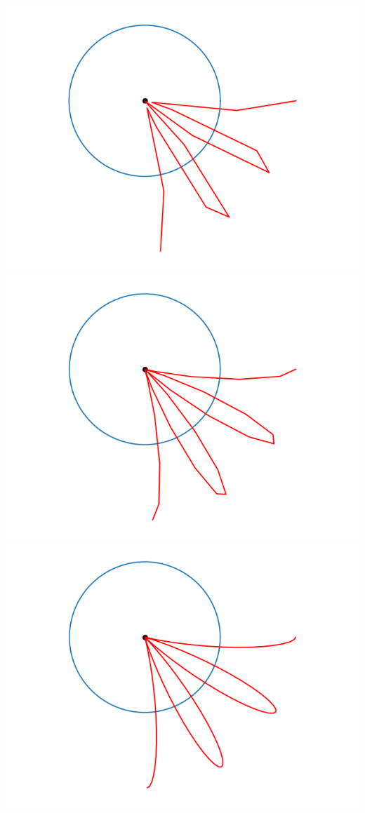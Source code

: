 \documentclass[11pt,class=report,crop=false]{standalone}
\begin{document}
\begin{center}
\includegraphics[scale=\myscale,scale=0.33]{figures/fourier-5a}
\includegraphics[scale=\myscale,scale=0.33]{figures/fourier-5b}
\includegraphics[scale=\myscale,scale=0.33]{figures/fourier-5c}


\end{center}
\end{document}

